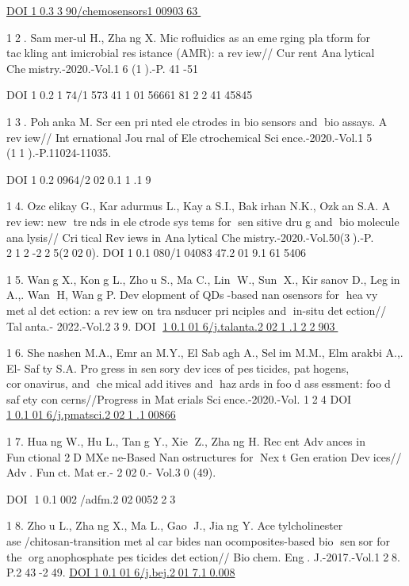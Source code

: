 {\href{https://doi.org/10.3390/chemosensors10090363}{DOI
10.3390/chemosensors10090363}

12. Sammer-ul H., Zhang X. Microfluidics as an emerging platform
for tackling antimicrobial resistance (AMR): a review// Current
Analytical Chemistry.-2020.-Vol.16 (1).-P. 41-51

DOI 10.2174/1573411015666181224145845

13. Pohanka M. Screen printed electrodes in biosensors and
bioassays. A review// International Journal of Electrochemical
Science.-2020.-Vol.15 (11).-P.11024-11035.

DOI 10.20964/2020.11.19

14. Ozcelikay G., Karadurmus L., Kaya S.I., Bakirhan N.K., Ozkan
S.A. A review: new trends in electrode systems for sensitive
drug and biomolecule analysis// Critical Reviews in Analytical
Chemistry.-2020.-Vol.50(3).-P. 212-225(2020). DOI
10.1080/10408347.2019.1615406

15. Wang X., Kong L., Zhou S., Ma C., Lin W., Sun X., Kirsanov
D., Legin A.,. Wan H, Wang P. Development of QDs-based nanosensors
for heavy metal detection: a review on transducer principles and
in-situ detection// Talanta.- 2022.-Vol.239. DOI
\href{https://doi.org/10.1016/j.talanta.2021.122903}{10.1016/j.talanta.2021.122903}

16. Shenashen M.A., Emran M.Y., El Sabagh A., Selim M.M.,
Elmarakbi A.,. El- Safty S.A. Progress in sensory devices of
pesticides, pathogens, coronavirus, and chemical additives and
hazards in food assessment: food safety concerns//Progress in
Materials Science.-2020.-Vol. 124 DOI
\href{http://dx.doi.org/10.1016/j.pmatsci.2021.100866}{10.1016/j.pmatsci.2021.100866}

17. Huang W., Hu L., Tang Y., Xie Z., Zhang H. Recent Advances in
Functional 2D MXene-Based Nanostructures for Next Generation
Devices// Adv. Funct. Mater.- 2020.- Vol.30 (49).

DOI 10.1002/adfm.202005223

18. Zhou L., Zhang X., Ma L., Gao J., Jiang Y. Acetylcholinester
ase/chitosan-transition metal carbides nanocomposites-based bio
sensor for the organophosphate pesticides detection// Biochem.
Eng. J.-2017.-Vol.128. P.243-249.
\href{https://doi.org/10.1016/j.bej.2017.10.008}{DOI
10.1016/j.bej.2017.10.008}

}
